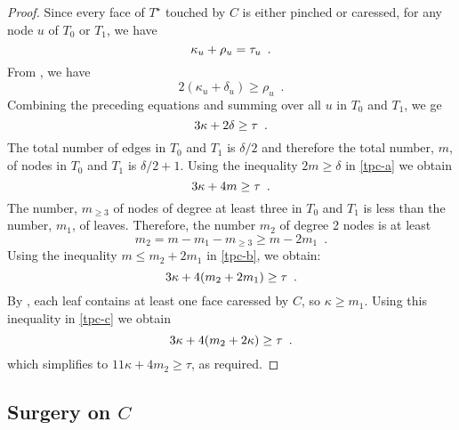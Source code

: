 \documentclass{patmorin}
\newcommand{\dual}[1]{{#1}^\star}
\begin{document}
\begin{proof}
Since every face of $\dual{T}$ touched by $C$ is either pinched or caressed, for any node $u$
of $T_0$ or $T_1$, we have
\begin{equation}
     \kappa_u + \rho_u = \tau_u \enspace . \eqlabel{tpc}
\end{equation}
From , we have 
\[
    2(\kappa_u+\delta_u) \ge \rho_u \enspace .
\]
Combining the preceding equations and summing over all $u$ in $T_0$
and $T_1$, we ge
\begin{equation}
     3\kappa + 2\delta \ge \tau \enspace . \eqlabel{tpc-a}
\end{equation}
The total number of edges in $T_0$
and $T_1$ is $\delta/2$ and therefore the total number, $m$,
of nodes in $T_0$ and $T_1$ is $\delta/2+1$. Using the inequality
$2m\ge \delta$ in \eqref{tpc-a} we obtain 
\begin{equation}
     3\kappa + 4m \ge \tau \enspace .  \eqlabel{tpc-b}
\end{equation}
The number, $m_{\ge 3}$ of nodes of degree at least three in $T_0$
and $T_1$ is less than the number, $m_1$, of leaves.  Therefore,
the number $m_2$ of degree 2 nodes is at least
\[
   m_2 = m - m_1 - m_{\ge 3} \ge m-2m_1 \enspace .
\]
Using the inequality $m\le m_2+2m_1$  in \eqref{tpc-b}, we obtain:
\begin{equation}
     3\kappa + 4(m_2+2m_1) \ge \tau \enspace .  \eqlabel{tpc-c}
\end{equation}
By , each leaf contains at least one face caressed
by $C$, so $\kappa \ge m_1$. Using this inequality in \eqref{tpc-c} we obtain
\begin{equation}
     3\kappa + 4(m_2+2\kappa) \ge \tau \enspace .  \eqlabel{tpc-d}
\end{equation}
which simplifies to $11\kappa + 4m_2 \ge \tau$, as required.
\end{proof}

\subsection{Surgery on $C$}
\end{document}
